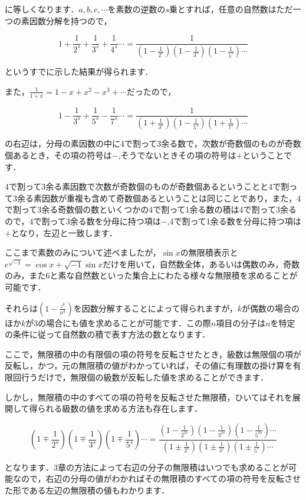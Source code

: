 \documentclass[./main]{subfiles}
\theoremstyle{break}
\begin{document}
に等しくなります．$a,b,c,\cdots$を素数の逆数の$s$乗とすれば，任意の自然数はただ一つの素因数分解を持つので，

\[1+\frac{1}{2^s}+\frac{1}{3^s}+\frac{1}{4^s}\cdots =\frac{1}{\left( 1-\frac{1}{2^s} \right)\left( 1-\frac{1}{3^s} \right)\left( 1-\frac{1}{5^s} \right)\cdots}\]

というすでに示した結果が得られます．

また，$\frac{1}{1+x}=1-x+x^2-x^3+\cdots$だったので，

\[1-\frac{1}{3^s}+\frac{1}{5^s}-\frac{1}{7^s}\cdots =\frac{1}{\left( 1+\frac{1}{3^s} \right)\left( 1-\frac{1}{5^s} \right)\left( 1+\frac{1}{7^s} \right)\cdots}\]

の右辺は，分母の素因数の中に4で割って3余る数で，次数が奇数個のものが奇数個あるとき，その項の符号は$-$,そうでないときその項の符号は$+$ということです．

4で割って3余る素因数で次数が奇数個のものが奇数個あるということと4で割って3余る素因数が重複も含めて奇数個あるということは同じことであり，また，4で割って3余る奇数個の数といくつかの4で割って1余る数の積は4で割って3余るので，4で割って3余る数を分母に持つ項は$-$,4で割って1余る数を分母に持つ項は$+$となり，左辺と一致します．

ここまで素数のみについて述べましたが，$\sin x$の無限積表示と$e^{\sqrt{-1}}=\cos x+\sqrt{-1}\sin x$だけを用いて，自然数全体，あるいは偶数のみ，奇数のみ，また6と素な自然数といった集合上にわたる様々な無限積を求めることが可能です．

それらは$\left( 1-\frac{z^k}{n^k} \right)$を因数分解することによって得られますが，$k$が偶数の場合のほか$k$が3の場合にも値を求めることが可能です．この際$n$項目の分子は$n$を特定の条件に従って自然数の積で表す方法の数となります．

ここで，無限積の中の有限個の項の符号を反転させたとき，級数は無限個の項が反転し，かつ，元の無限積の値がわかっていれば，その値に有理数の掛け算を有限回行うだけで，無限個の級数が反転した値を求めることができます．

しかし，無限積の中のすべての項の符号を反転させた無限積，ひいてはそれを展開して得られる級数の値を求める方法も存在します．

\[\left( 1\mp \frac{1}{2^s} \right)\left( 1\mp \frac{1}{3^s} \right)\left( 1\mp\frac{1}{5^s} \right)\cdots=\frac{\left( 1-\frac{1}{2^{2s}} \right)\left( 1-\frac{1}{3^{2s}} \right)\left( 1-\frac{1}{5^{2s}} \right)\cdots}{\left( 1\pm \frac{1}{2^s} \right)\left( 1\pm \frac{1}{3^s} \right)\left( 1\pm\frac{1}{5^s} \right)\cdots}\]

となります．3章の方法によって右辺の分子の無限積はいつでも求めることが可能なので，右辺の分母の値がわかればその無限積のすべての項の符号を反転させた形である左辺の無限積の値もわかります．
\end{document}
